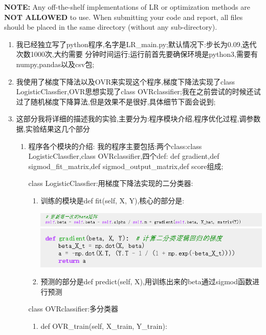 \documentclass[11pt, a4paper, UTF8]{ctexart}
\begin{document}
\textbf{NOTE:} Any off-the-shelf implementations of LR or optimization methods are \textbf{NOT ALLOWED} to use. When submitting your code and report, all files should be placed in the same directory (without any sub-directory).

\begin{solution}
\begin{enumerate}
	\item 我已经独立写了python程序,名字是LR\_main.py;默认情况下:步长为0.09,迭代次数1000次,大约需要 分钟时间运行;运行前首先要确保环境是python3,需要有numpy,pandas以及csv包;
	\item 我使用了梯度下降法以及OVR来实现这个程序,梯度下降法实现了class LogisticClassfier,OVR思想实现了class OVRclassifier;我在之前尝试的时候还试过了随机梯度下降算法,但是效果不是很好,具体细节下面会说到;
	\item 这部分我将详细的描述我的实验,主要分为:程序模块介绍,程序优化过程,调参数据,实验结果这几个部分
	\begin{enumerate}
		\item 程序各个模块的介绍:
		我的程序主要包括:两个class:class LogisticClassfier,class OVRclassifier,四个def: def gradient,def sigmod\_fit\_matrix,def sigmod\_output\_matrix,def score组成;
		
		class LogisticClassfier:用梯度下降法实现的二分类器:
		
		\begin{enumerate}
			\item 训练的模块是def fit(self, X, Y),核心的部分是:
	
		\includegraphics[scale=0.5]{1.png}\\
		\includegraphics[scale=0.5]{2.png}\\
		
		\item 	预测的部分是def predict(self, X),用训练出来的beta通过sigmod函数进行预测
	
		\end{enumerate}
		
		class OVRclassifier:多分类器
		\begin{enumerate}
			\item def OVR\_train(self, X\_train, Y\_train):
			

\end{enumerate}
\end{enumerate}
\end{enumerate}
\end{solution}
\end{document}
